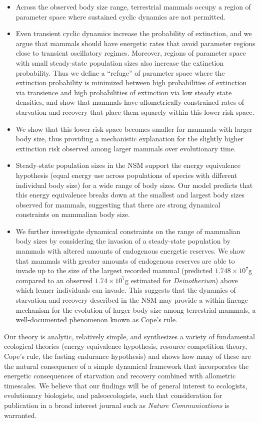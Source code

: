 \documentclass[ucm,12pt]{ucletter}
\begin{document}
\begin{letter}
\begin{itemize}
  \item Across the observed body size range, terrestrial mammals occupy a region of parameter space where sustained cyclic dynamics are not permitted.
  \item Even transient cyclic dynamics increase the probability of extinction, and we argue that mammals should have energetic rates that avoid parameter regions close to transient oscillatory regimes. Moreover, regions of parameter space with small steady-state population sizes also increase the extinction probability. Thus we define a ``refuge'' of parameter space where the extinction probability is minimized between high probabilities of extinction via transience and high probabilities of extinction via low steady state densities, and show that mammals have allometrically constrained rates of starvation and recovery that place them squarely within this lower-risk space. 
  \item We show that this lower-risk space becomes smaller for mammals with larger body size, thus providing a mechanistic explanation for the slightly higher extinction risk observed among larger mammals over evolutionary time.
  \item Steady-state population sizes in the NSM support the energy equivalence hypothesis (equal energy use across populations of species with different individual body size) for a wide range of body sizes. Our model predicts that this energy equivalence breaks down at the smallest and largest body sizes observed for mammals, suggesting that there are strong dynamical constraints on mammalian body size. 
  \item We further investigate dynamical constraints on the range of mammalian body sizes by considering the invasion of a steady-state population by mammals with altered amounts of endogenous energetic reserves. We show that mammals with greater amounts of endogenous reserves are able to invade up to the size of the largest recorded mammal (predicted $1.748\times10^7$g compared to an observed $1.74\times10^7$g estimated for \emph{Deinotherium}) above which leaner individuals can invade. This suggests that the dynamics of starvation and recovery described in the NSM may provide a within-lineage mechanism for the evolution of larger body size among terrestrial mammals, a well-documented phenomenon known as Cope's rule.
\end{itemize}


Our theory is analytic, relatively simple, and synthesizes a variety of fundamental ecological theories (energy equivalence hypothesis, resource competition theory, Cope's rule, the fasting endurance hypothesis) and shows how many of these are the natural consequence of a simple dynamical framework that incorporates the energetic consequences of starvation and recovery combined with allometric timescales. We believe that our findings will be of general interest to ecologists, evolutionary biologists, and paleoecologists, such that consideration for publication in a broad interest journal such as \emph{Nature Communications} is warranted.


\end{letter}
\end{document}
